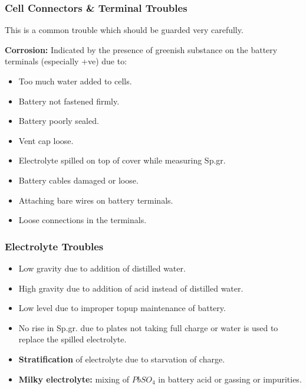\documentclass{beamer}
\begin{document}
\begin{frame}     %
  \frametitle{Cell Connectors \& Terminal Troubles}
  \fontsize{8pt}{14}\selectfont
  \begin{center}
    This is a common trouble which should be guarded very carefully.
  \end{center}
  
  \textbf{Corrosion:} Indicated by the presence of greenish substance on the battery terminals (especially +ve) due to:
  \begin{itemize}
    \item Too much water added to cells.
    \item Battery not fastened firmly.
    \item Battery poorly sealed.
    \item Vent cap loose.
    \item Electrolyte spilled on top of cover while measuring Sp.gr.
    \item Battery cables damaged or loose.
    \item Attaching bare wires on battery terminals.
    \item Loose connections in the terminals.
  \end{itemize}
\end{frame}

\begin{frame}     %
  \frametitle{Electrolyte Troubles}
  \fontsize{8pt}{14}\selectfont

  \begin{itemize}
    \item Low gravity due to addition of distilled water.
    \item High gravity due to addition of acid instead of distilled water.
    \item Low level due to improper topup maintenance of battery.
    \item No rise in Sp.gr. due to plates not taking full charge or water is used to replace the spilled electrolyte.
    \item \textbf{Stratification} of electrolyte due to starvation of charge.
    \item \textbf{Milky electrolyte:} mixing of $PbSO_{4}$ in battery acid or gassing or impurities.
  \end{itemize}
\end{frame}
\end{document}
